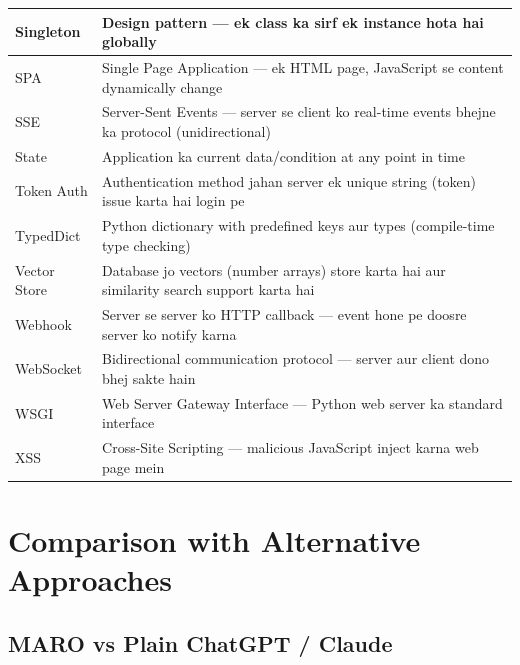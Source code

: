 \documentclass[11pt,a4paper,twoside]{report}
\begin{document}
\begin{longtable}{|p{3.5cm}|p{10cm}|}
Singleton & Design pattern --- ek class ka sirf ek instance hota hai globally \\
\hline
SPA & Single Page Application --- ek HTML page, JavaScript se content dynamically change \\
\hline
SSE & Server-Sent Events --- server se client ko real-time events bhejne ka protocol (unidirectional) \\
\hline
State & Application ka current data/condition at any point in time \\
\hline
Token Auth & Authentication method jahan server ek unique string (token) issue karta hai login pe \\
\hline
TypedDict & Python dictionary with predefined keys aur types (compile-time type checking) \\
\hline
Vector Store & Database jo vectors (number arrays) store karta hai aur similarity search support karta hai \\
\hline
Webhook & Server se server ko HTTP callback --- event hone pe doosre server ko notify karna \\
\hline
WebSocket & Bidirectional communication protocol --- server aur client dono bhej sakte hain \\
\hline
WSGI & Web Server Gateway Interface --- Python web server ka standard interface \\
\hline
XSS & Cross-Site Scripting --- malicious JavaScript inject karna web page mein \\
\hline
\end{longtable}



\chapter{Comparison with Alternative Approaches}

\section{MARO vs Plain ChatGPT / Claude}
\end{document}
